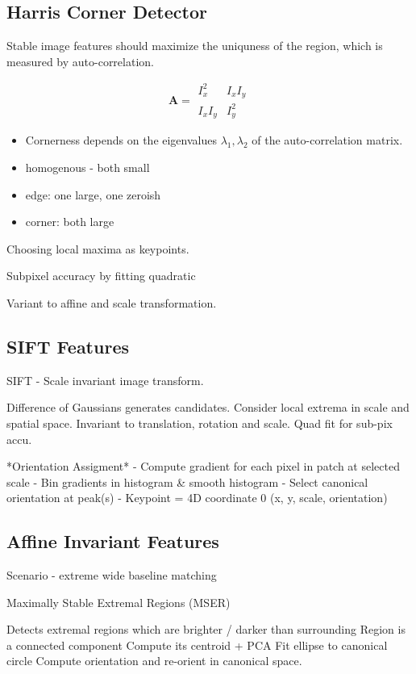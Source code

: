 \subsection{Harris Corner Detector}

Stable image features should maximize the uniquness of the region, which is measured by auto-correlation.

$$ 
\mathbf{A} =  \begin{matrix} I_x^2 &  I_xI_y \\
I_xI_y & I_y^2
\end{matrix} $$

\begin{itemize}
\item Cornerness depends on the eigenvalues $\lambda_1,\lambda_2$ of the auto-correlation matrix.
\item homogenous - both small
\item edge: one large, one zeroish
\item corner: both large
\end{itemize}

Choosing local maxima as keypoints. 

Subpixel accuracy by fitting quadratic 

Variant to affine and scale transformation.

\subsection{SIFT Features}

SIFT - Scale invariant image transform.

Difference of Gaussians generates candidates. 
Consider local extrema in scale and spatial space.
Invariant to translation, rotation and scale.
Quad fit for sub-pix accu.

*Orientation Assigment*
- Compute gradient for each pixel in patch at selected scale
- Bin gradients in histogram \& smooth histogram
- Select canonical orientation at peak(s)
- Keypoint = 4D coordinate 0 (x, y, scale, orientation)

\subsection{Affine Invariant Features}
Scenario - extreme wide baseline matching

Maximally Stable Extremal Regions (MSER)

Detects extremal regions which are brighter / darker than surrounding
Region is a connected component
Compute its centroid + PCA
Fit ellipse to canonical circle
Compute orientation and re-orient in canonical space.

